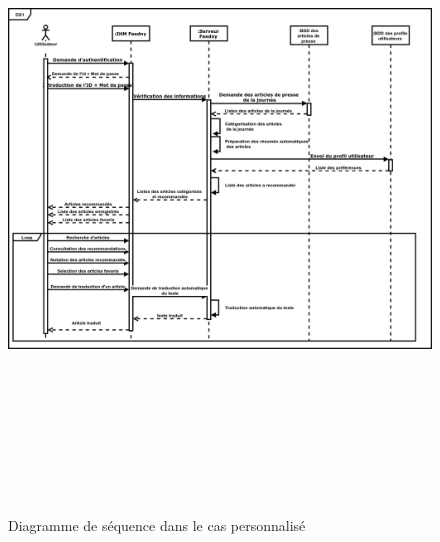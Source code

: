 \begin{figure}[H]
    \centering
    \includegraphics[height=500pt,width=425pt]{img/chapter3/diagseqperso.png}
    \caption{Diagramme de séquence dans le cas personnalisé}
\end{figure}


